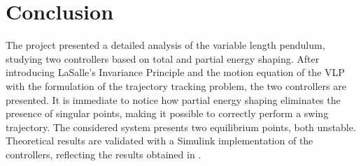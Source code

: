 \documentclass[main.tex]{subfiles}
\begin{document}
\section{Conclusion}
\label{sec:conclusion}
The project presented a detailed analysis of the variable
length pendulum, studying two controllers based on
total and partial energy shaping. After introducing LaSalle's
Invariance Principle and the motion equation of the VLP
with the formulation of the trajectory tracking problem,
the two controllers are presented. It is immediate to notice
how partial energy shaping eliminates the presence of singular
points, making it possible to correctly perform a swing
trajectory. The considered system presents two equilibrium
points, both unstable. Theoretical results are validated with
a Simulink implementation of the controllers, reflecting the
results obtained in \cite{xin2014control}.
\end{document}
